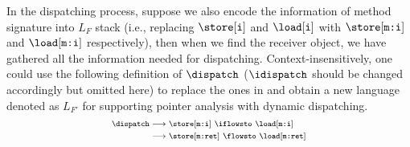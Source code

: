 In the dispatching process, suppose we also encode the information of method signature into $L_F$ stack (i.e., replacing $\store[\texttt{i}]$ and $\load[\texttt{i}]$ with $\store[\texttt{m:i}]$ and $\load[\texttt{m:i}]$ respectively), then when we find the receiver object, we have gathered all the information needed for dispatching. Context-insensitively, one could use 
the following definition of $\dispatch$ ($\idispatch$ should be changed accordingly but omitted here) to replace the ones in  and obtain a new language denoted as $L_{F'}$ for supporting pointer analysis with dynamic dispatching. 
\begin{equation} \scriptsize
\label{eqn:newFlows}
\begin{split} 
\dispatch & \longrightarrow \store[\texttt{m:i}]\ \iflowsto\ \load[\texttt{m:i}]\\
        & \longrightarrow \store[\texttt{m:ret}] \ \flowsto \ \load[\texttt{m:ret}]
\end{split}
\end{equation}

